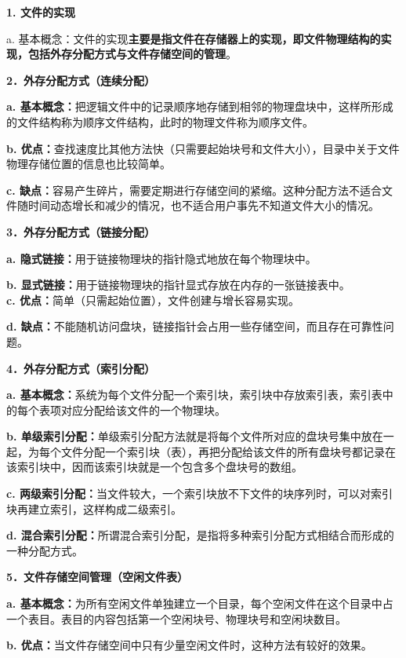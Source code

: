 {{\textbf{1. 文件的实现}}}

{{a.
基本概念：文件的实现\textbf{主要是指文件在存储器上的实现，即文件物理结构的实现，包括外存分配方式与文件存储空间的管理}。}{}{}}

\textbf{{2．外存分配方式（连续分配）}}

\textbf{a.
基本概念：}{把逻辑文件中的记录顺序地存储到相邻的物理盘块中，这样所形成的文件结构称为顺序文件结构，此时的物理文件称为顺序文件。}

\textbf{b.
优点：}查找速度比其他方法快（只需要起始块号和文件大小），目录中关于文件物理存储位置的信息也比较简单。

\textbf{c.
缺点：}容易产生碎片，需要定期进行存储空间的紧缩。{这种分配方法不适合文件随时间动态增长和减少的情况，也不适合用户事先不知道文件大小的情况。}

\textbf{{{3}\textbf{{．外存分配方式（链接分配）}}}}

\textbf{a. 隐式链接：}{用于链接物理块的指针隐式地放在每个物理块中。}

\textbf{b.
显式链接：}用于链接物理块的指针显式存放在内存的一张链接表中。\\

\textbf{c. 优点：}简单（只需起始位置），文件创建与增长容易实现。

\textbf{d.
缺点：}不能随机访问盘块，链接指针会占用一些存储空间，而且存在可靠性问题。

\textbf{\textbf{{\textbf{4．外存分配方式（索引分配）}}}}

\textbf{a.
基本概念：}系统为每个文件分配一个索引块，索引块中存放索引表，索引表中的每个表项对应分配给该文件的一个物理块。

\textbf{b.
单级索引分配：}单级索引分配方法就是将每个文件所对应的盘块号集中放在一起，为每个文件分配一个索引块（表），再把分配给该文件的所有盘块号都记录在该索引块中，因而该索引块就是一个包含多个盘块号的数组。

\textbf{c.
两级索引分配：}当文件较大，一个索引块放不下文件的块序列时，可以对索引块再建立索引，这样构成二级索引。

\textbf{d.
混合索引分配：}{所谓混合索引分配，是指将多种索引分配方式相结合而形成的一种分配方式。}

\textbf{{{5．文件存储空间管理（}\textbf{{空闲文件表}}{）}}}

\textbf{a.
基本概念：}{为所有空闲文件单独建立一个目录，每个空闲文件在这个目录中占一个表目。表目的内容包括第一个空闲块号、物理块号和空闲块数目。}

\textbf{b.
优点：}{当文件存储空间中只有少量空闲文件时，这种方法有较好的效果。}

